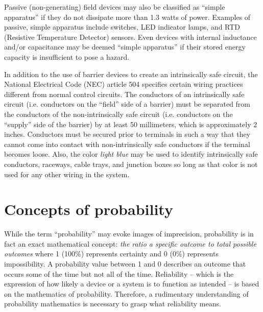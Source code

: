 Passive (non-generating) field devices may also be classified as ``simple apparatus'' if they do not dissipate more than 1.3 watts of power.  Examples of passive, simple apparatus include switches, LED indicator lamps, and RTD (Resistive Temperature Detector) sensors.  Even devices with internal inductance and/or capacitance may be deemed ``simple apparatus'' if their stored energy capacity is insufficient to pose a hazard.

\vskip 10pt

In addition to the use of barrier devices to create an intrinsically safe circuit, the National Electrical Code (NEC) article 504 specifies certain wiring practices different from normal control circuits.  The conductors of an intrinsically safe circuit (i.e. conductors on the ``field'' side of a barrier) must be separated from the conductors of the non-intrinsically safe circuit (i.e. conductors on the ``supply'' side of the barrier) by at least 50 millimeters, which is approximately 2 inches.  Conductors must be secured prior to terminals in such a way that they cannot come into contact with non-intrinsically safe conductors if the terminal becomes loose.  Also, the color \textit{light blue} may be used to identify intrinsically safe conductors, raceways, cable trays, and junction boxes so long as that color is not used for any other wiring in the system.










\filbreak
\section{Concepts of probability}

While the term ``probability'' may evoke images of imprecision, probability is in fact an exact mathematical concept: \textit{the ratio a specific outcome to total possible outcomes} where 1 (100\%) represents certainty and 0 (0\%) represents impossibility.  A probability value between 1 and 0 describes an outcome that occurs some of the time but not all of the time.  Reliability -- which is the expression of how likely a device or a system is to function as intended -- is based on the mathematics of probability.  Therefore, a rudimentary understanding of probability mathematics is necessary to grasp what reliability means.  

